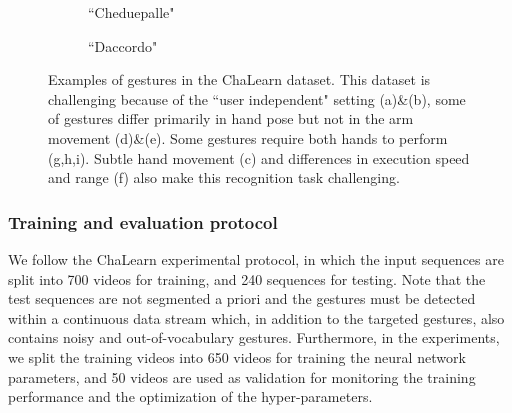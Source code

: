 \begin{figure}[t]
\begin{subfigure}[c]{0.15\textwidth}
                \caption{\small{``Cheduepalle"}}
        \end{subfigure}
       \begin{subfigure}[c]{0.15\textwidth}
        \centering
                \caption{\small{``Daccordo"}}
        \end{subfigure}
  \caption{
\small{Examples of gestures in the ChaLearn dataset.
This dataset is challenging because of the ``user independent" setting (a)\&(b), some of gestures differ primarily in hand pose but not in the arm movement (d)\&(e). Some gestures require both hands to perform (g,h,i).
Subtle hand movement (c) and differences in execution speed and range (f) also make this recognition task challenging.
  }}
\label{fig:chalearnclasses}
\end{figure}
\subsubsection{Training and evaluation protocol}

We follow the ChaLearn experimental protocol, in which the input sequences are split into 700 videos for training, and 240 sequences for testing.
Note that the   test sequences  are not segmented a priori and the gestures must be detected within a continuous data stream
which, in addition to the targeted gestures, also contains noisy and out-of-vocabulary gestures.
%
Furthermore, in the experiments, we split the training videos into 650 videos for training the neural network parameters, and 50 videos
are used as validation for monitoring the training performance and the optimization of the hyper-parameters.


